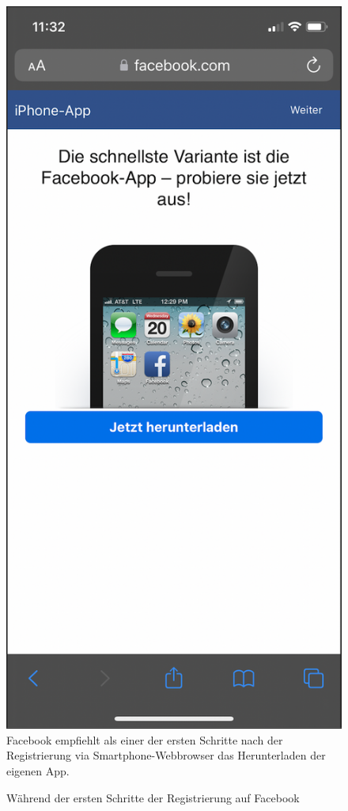\documentclass[a4paper]{scrartcl}
\begin{document}
\begin{figure}[H]
	\centering
	\caption{Während der ersten Schritte der Registrierung auf Facebook}
	\includegraphics[scale=0.3]{_assets/facebook_native_app2.png} \\
	\justifying
	\small	
	Facebook empfiehlt als einer der ersten Schritte nach der Registrierung via Smartphone-Webbrowser das Herunterladen der eigenen App.
\end{figure}
\end{document}
